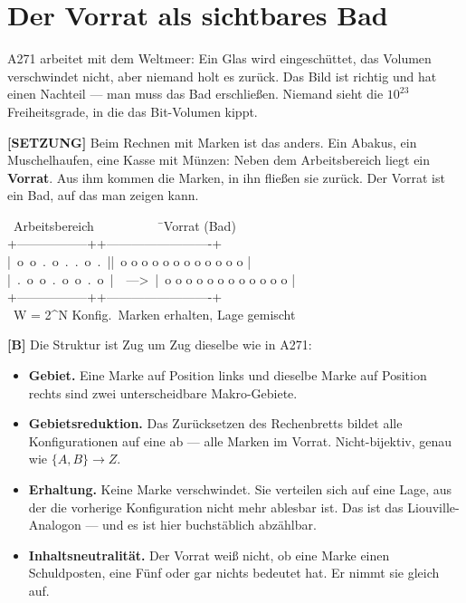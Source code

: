 \section{Der Vorrat als sichtbares Bad}

A271 arbeitet mit dem Weltmeer: Ein Glas wird eingeschüttet, das Volumen
verschwindet nicht, aber niemand holt es zurück. Das Bild ist richtig und hat
einen Nachteil --- man muss das Bad erschließen. Niemand sieht die $10^{23}$
Freiheitsgrade, in die das Bit-Volumen kippt.

\textbf{[SETZUNG]} Beim Rechnen mit Marken ist das anders. Ein Abakus, ein Muschelhaufen, eine
Kasse mit Münzen: Neben dem Arbeitsbereich liegt ein \textbf{Vorrat}. Aus ihm
kommen die Marken, in ihn fließen sie zurück. Der Vorrat ist ein Bad, auf das man
zeigen kann.

\begin{center}
\begin{minipage}{0.80\textwidth}
\ttfamily\small
\begin{tabbing}
\ Arbeitsbereich\ \ \ \ \ \ \ \ \ \ \=\ Vorrat (Bad)\\[0.3em]
+-----------------+\>+-------------------------+\\
|\ o\ o\ .\ o\ .\ .\ o\ .\ |\>|\ o o o o o o o o o o o o |\\
|\ .\ o\ o\ .\ o\ o\ .\ o\ |\ \ ---\textgreater\ \>|\ o o o o o o o o o o o o |\\
+-----------------+\>+-------------------------+\\
\ W = 2\^{}N Konfig.\>\ Marken erhalten, Lage gemischt
\end{tabbing}
\end{minipage}
\end{center}

\textbf{[B]} Die Struktur ist Zug um Zug dieselbe wie in A271:

\begin{itemize}[leftmargin=1.4em,itemsep=0.3em]
  \item \textbf{Gebiet.} Eine Marke auf Position links und dieselbe Marke auf
        Position rechts sind zwei unterscheidbare Makro-Gebiete.
  \item \textbf{Gebietsreduktion.} Das Zurücksetzen des Rechenbretts bildet alle
        Konfigurationen auf eine ab --- alle Marken im Vorrat. Nicht-bijektiv,
        genau wie $\{A,B\}\to Z$.
  \item \textbf{Erhaltung.} Keine Marke verschwindet. Sie verteilen sich auf eine
        Lage, aus der die vorherige Konfiguration nicht mehr ablesbar ist. Das ist
        das Liouville-Analogon --- und es ist hier buchstäblich abzählbar.
  \item \textbf{Inhaltsneutralität.} Der Vorrat weiß nicht, ob eine Marke einen
        Schuldposten, eine Fünf oder gar nichts bedeutet hat. Er nimmt sie gleich
        auf.
\end{itemize}

